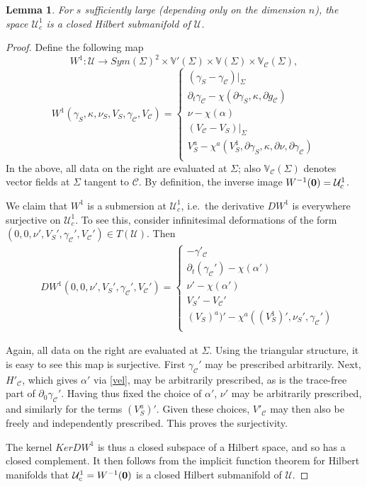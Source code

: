 \documentclass[10pt]{amsart}
\renewcommand{\a}{\alpha}
\newcommand{\g}{\gamma}
\newcommand{\Si}{\Sigma}
\renewcommand{\k}{\kappa}
\newcommand{\cC}{{\mathcal C}}
\newcommand{\cU}{{\mathcal U}}
\newcommand{\bV}{\mathbb V}
\newcommand{\be}{\begin{equation}}
\newcommand{\ee}{\end{equation}}
\newcommand{\bes}{\begin{equation*}}
\newcommand{\ees}{\end{equation*}}
\newcommand{\p}{\partial}
\renewcommand{\to}{\rightarrow}
\newcommand{\<}{\langle}
\renewcommand{\>}{\rangle}
\theoremstyle{plain}
\newtheorem{lemma}{Lemma}[section]
\theoremstyle{remark}
\theoremstyle{definition}
\numberwithin{equation}{section}
\begin{document}
\begin{lemma}\label{Man1}
For $s$ sufficiently large (depending only on the dimension $n$), the space $\cU_c^1$ is a closed Hilbert submanifold of $\cU$. 
\end{lemma}
\begin{proof}
    Define the following map 
\be \label{CompOp1}
W^1: \cU \to Sym(\Si)^2 \times \bV'(\Si) \times \bV(\Si) \times \bV_{\cC}(\Si),
\ee
\bes
W^1(\g_S, \k, \nu_S, V_S, \g_{\cC}, V_{\cC}) = 
\left\{ 
\begin{array}{l}
(\g_S - \g_{\cC})|_{\Si} \\
\p_t \g_{\cC} - \chi(\p \g_S, \k, \p g_\cC) \\
\nu - \chi(\a) \\
(V_{\cC} - V_S)|_{\Si} \\
V_S^a - \chi^a(V_S^1,\p \g_S,\k,\p \nu,\p \g_\cC) \\
\end{array}\right.
\ees
In the above, all data on the right are evaluated at $\Si$; also $\bV_{\cC}(\Si)$ denotes vector fields at $\Si$ tangent to $\cC$. 
By definition, the inverse image $W^{-1}({\bf 0}) = \cU_c^1$. 

  We claim that $W^1$ is a submersion at $\cU_c^1$, i.e.~the derivative $DW^1$ is everywhere surjective on $\cU_c^1$. To see this, consider 
infinitesimal deformations of the form $(0, 0, \nu', V_S', \g_{\cC}', V_{\cC}' ) \in T(\cU)$. Then 
\bes 
\begin{split}
& DW^1(0, 0, \nu', V_S', \g_{\cC}', V_{\cC}' ) = 
\begin{cases}
- \g'_{\cC} \\
 \p_t (\g_{\cC}') - \chi(\a')\\
 \nu' - \chi(\a')\\
 V_S' - V_{\cC}'\\
 (V_S)^a)' - \chi^a((V_S^1)', \nu_S', \g_{\cC}') \\
 \end{cases}
\end{split}
\ees

  Again, all data on the right are evaluated at $\Si$. Using the triangular structure, it is easy to see this map is surjective. First $\g_{\cC}'$ may be prescribed 
arbitrarily. Next, $H'_{\cC}$, which gives $\a'$ via \eqref{vel}, may be arbitrarily prescribed, as is the trace-free part of $\p_0 \g_{\cC}'$. Having thus fixed the 
choice of $\a'$, $\nu'$ may be arbitrarily prescribed, and similarly for the terms $(V_S^a)'$. Given these choices, $V'_{\cC}$ 
may then also be freely and independently prescribed. This proves the surjectivity. 


The kernel $Ker DW^1$ is thus a closed subspace of a Hilbert space, and so has a closed complement. It then follows from the implicit function theorem for 
Hilbert manifolds that $\cU_c^1 = W^{-1}({\bf 0})$ is a closed Hilbert submanifold of $\cU$. 

\end{proof}
\end{document}
